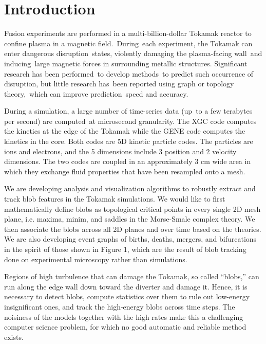\newcommand{\cA}{\mathcal{A}} %
\newcommand{\R}{\mathbb{R}} %
\newcommand{\cD}{\mathcal{D}} %
\newcommand{\cC}{\mathcal{C}} %
\newcommand{\Xs}{X^*} %
\newcommand{\cN}{\mathcal{N}} %


\section{Introduction}
\label{sec:intro}

Fusion experiments are performed in a multi-billion-dollar Tokamak reactor to confine plasma in a magnetic field. During each experiment, the Tokamak can enter dangerous disruption states, violently damaging the plasma-facing wall and inducing large magnetic forces in surrounding metallic structures. Significant research has been performed to develop methods to predict such occurrence of disruption, but little research has been reported using graph or topology theory, which can improve prediction speed and accuracy.

During a simulation, a large number of time-series data (up to a few terabytes per second) are computed at microsecond granularity. The XGC code computes the kinetics at the edge of the Tokamak while the GENE code computes the kinetics in the core. Both codes are 5D kinetic particle codes. The particles are ions and electrons, and the 5 dimensions include 3 position and 2 velocity dimensions. The two codes are coupled in an approximately 3 cm wide area in which they exchange fluid properties that have been resampled onto a mesh.

We are developing analysis and visualization algorithms to robustly extract and track blob features in the Tokamak simulations.  We would like to first mathematically define blobs as topological critical points in every single 2D mesh plane, i.e. maxima, minim, and saddles in the Morse-Smale complex theory.  We then associate the blobs across all 2D planes and over time based on the theories.  We are also developing event graphs of births, deaths, mergers, and bifurcations in the spirit of those shown in Figure 1, which are the result of blob tracking done on experimental microscopy rather than simulations.

Regions of high turbulence that can damage the Tokamak, so called “blobs,” can run along the edge wall down toward the diverter and damage it. Hence, it is necessary to detect blobs, compute statistics over them to rule out low-energy insignificant ones, and track the high-energy blobs across time steps. The noisiness of the models together with the high rates make this a challenging computer science problem, for which no good automatic and reliable method exists.

